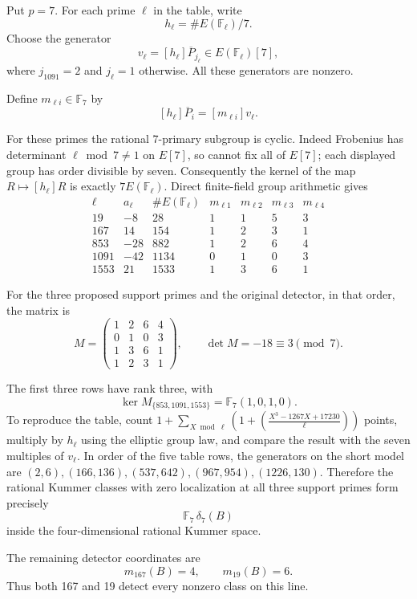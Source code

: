 \documentclass[11pt]{article}
\begin{document}
Put $p=7$. For each prime $\ell$ in the table,
write
\[
 h_\ell=\#E(\mathbb F_\ell)/7.
\]
Choose the generator
\[
 v_\ell=[h_\ell]\overline{P}_{j_\ell}
 \in E(\mathbb F_\ell)[7],
\]
where $j_{1091}=2$ and $j_\ell=1$ otherwise.
All these generators are nonzero.

Define $m_{\ell i}\in\mathbb F_7$ by
\[
 [h_\ell]\overline{P}_i=[m_{\ell i}]v_\ell.
\]

For these primes the rational $7$-primary subgroup is cyclic. Indeed
Frobenius has determinant $\ell\bmod 7\ne1$ on $E[7]$, so cannot fix
all of $E[7]$; each displayed group has order divisible by seven.
Consequently the kernel of the map $R\mapsto[h_\ell]R$ is exactly
$7E(\mathbb F_\ell)$. Direct finite-field group arithmetic gives
\[
\begin{array}{c|r|r|rrrr}
 \ell&a_\ell&\#E(\mathbb F_\ell)&
 m_{\ell1}&m_{\ell2}&m_{\ell3}&m_{\ell4}\\ \hline
 19&-8&28&1&1&5&3\\
 167&14&154&1&2&3&1\\
 853&-28&882&1&2&6&4\\
 1091&-42&1134&0&1&0&3\\
 1553&21&1533&1&3&6&1
\end{array}
\]

For the three proposed support primes and the
original detector, in that order, the matrix is
\[
 M=
 \begin{pmatrix}
 1&2&6&4\\
 0&1&0&3\\
 1&3&6&1\\
 1&2&3&1
 \end{pmatrix},
 \qquad
 \det M=-18\equiv3\pmod7.
\]

The first three rows have rank three, with
\[
 \ker M_{\{853,1091,1553\}}
   =\mathbb F_7(1,0,1,0).
\]
To reproduce the table, count
$1+\sum_{X\bmod\ell}(1+(\frac{X^3-1267X+17230}{\ell}))$
points, multiply by $h_\ell$ using the elliptic group law, and compare
the result with the seven multiples of $v_\ell$. In order of the
five table rows, the generators on the short model are
$(2,6),(166,136),(537,642),(967,954),(1226,130)$.
Therefore the rational Kummer classes with
zero localization at all three support primes
form precisely
\[
 \boxed{\mathbb F_7\,\delta_7(B)}
\]
inside the four-dimensional rational Kummer
space.

The remaining detector coordinates are
\[
 m_{167}(B)=4,\qquad m_{19}(B)=6.
\]
Thus both 167 and 19 detect every nonzero class
on this line.
\end{document}
